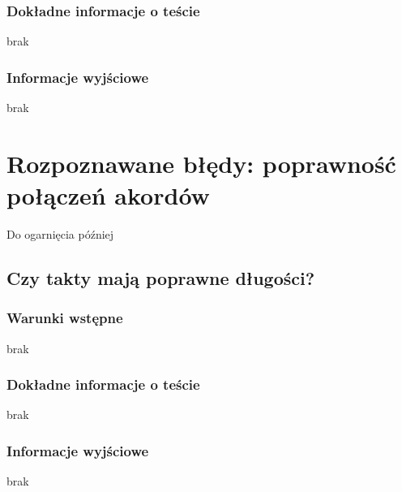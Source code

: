 \documentclass[dokumentacja.tex]{subfiles}
\begin{document}
\subsubsection{Dokładne informacje o teście}
brak
\subsubsection{Informacje wyjściowe}
brak


\section{Rozpoznawane błędy: poprawność połączeń akordów}
Do ogarnięcia później
\subsection{Czy takty mają poprawne długości?}
\subsubsection{Warunki wstępne}
brak
\subsubsection{Dokładne informacje o teście}
brak
\subsubsection{Informacje wyjściowe}
brak
\end{document}
